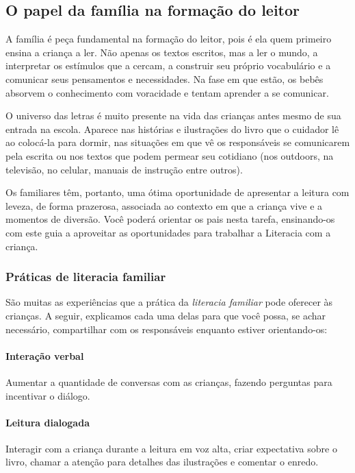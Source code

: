 \documentclass[11pt]{extarticle}
\begin{document}
\subsection{O papel da família na formação do leitor}
A família é peça fundamental na formação do leitor, pois é ela quem primeiro 
ensina a criança a ler. Não apenas os textos escritos, mas a ler o mundo, a 
interpretar os estímulos que a cercam, a construir seu próprio vocabulário e a 
comunicar seus pensamentos e necessidades. Na fase em que estão, os bebês 
absorvem o conhecimento com voracidade e tentam aprender a se comunicar. 

O universo das letras é muito presente na vida das crianças antes mesmo de sua 
entrada na escola. Aparece nas histórias e ilustrações do livro que o cuidador 
lê ao colocá-la para dormir, nas situações em que vê os responsáveis se comunicarem 
pela escrita ou nos textos que podem permear seu cotidiano (nos outdoors, na 
televisão, no celular, manuais de instrução entre outros). 

Os familiares têm, 
portanto, uma ótima oportunidade de apresentar a leitura com leveza, de forma 
prazerosa, associada ao contexto em que a criança vive e a momentos de diversão. 
Você poderá orientar os pais nesta tarefa, ensinando-os com este guia a aproveitar 
as oportunidades para trabalhar a Literacia com a criança.


\subsubsection{Práticas de literacia familiar} 

São muitas as experiências que a prática da \textit{literacia familiar} 
pode oferecer às crianças. A seguir, explicamos cada uma delas para que você possa, 
se achar necessário, compartilhar com os responsáveis enquanto estiver orientando-os: 

\paragraph{Interação verbal} Aumentar a quantidade de conversas com as 
crianças, fazendo perguntas para incentivar o diálogo.

\paragraph{Leitura dialogada} Interagir com a criança durante a leitura 
em voz alta, criar expectativa sobre o livro, chamar a atenção para detalhes 
das ilustrações e comentar o enredo.
\end{document}
